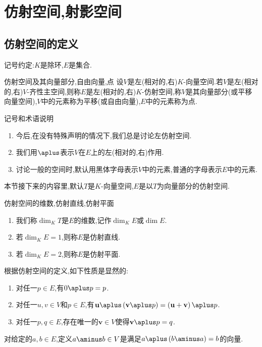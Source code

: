 \chapter{仿射空间,射影空间}

\section{仿射空间的定义}

记号约定:$K$是除环,$E$是集合.

\begin{definition}{仿射空间及其向量部分,自由向量,点}{}
	设$V$是左(相对的,右)$K$-向量空间.若$V$是左(相对的,右)$V$-齐性主空间,则称$E$是左(相对的,右)$K$-仿射空间,称$V$是其向量部分(或平移向量空间),$V$中的元素称为平移(或自由向量),$E$中的元素称为点.
\end{definition}

\begin{remark}{记号和术语说明}{}
	\begin{enumerate}
		\item 今后,在没有特殊声明的情况下,我们总是讨论左仿射空间.
		\item 我们用$\aplus$表示$V$在$E$上的左(相对的,右)作用.
		\item 讨论一般的空间时,默认用黑体字母表示$V$中的元素,普通的字母表示$E$中的元素.
	\end{enumerate}
\end{remark}

本节接下来的内容里,默认$T$是$K$-向量空间,$E$是以$T$为向量部分的仿射空间.

\begin{definition}{仿射空间的维数,仿射直线,仿射平面}{}
	\begin{enumerate}
		\item 我们称$\dim_{K}T$是$E$的维数,记作$\dim_{K}E$或$\dim E$.
		\item 若$\dim_{K}E=1$,则称$E$是仿射直线.
		\item 若$\dim_{K}E=2$,则称$E$是仿射平面.
	\end{enumerate}
\end{definition}

\begin{remark}{}{}
	根据仿射空间的定义,如下性质是显然的:
	\begin{enumerate}
		\item 对任一$p\in E$,有$0\aplus p=p$.
		\item 对任一$u,v\in V$和$p\in E$,有$\mathbf{u}\aplus\left(\mathbf{v}\aplus p\right)=\left(\mathbf{u}+\mathbf{v}\right)\aplus p$.
		\item 对任一$p,q\in E$,存在唯一的$\mathbf{v}\in V$使得$\mathbf{v}\aplus p=q$.
	\end{enumerate}
	对给定的$a,b\in E$,定义$a\aminus b\in V$是满足$a\aplus\left(b\aminus a\right)=b$的向量.
\end{remark}

